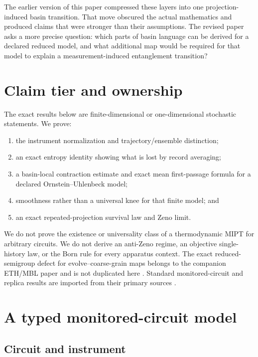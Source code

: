 \documentclass[11pt]{article}
\begin{document}
The earlier version of this paper compressed these layers into one
projection-induced basin transition.  That move obscured the actual
mathematics and produced claims that were stronger than their
assumptions.  The revised paper asks a more precise question: which
parts of basin language can be derived for a declared reduced model, and
what additional map would be required for that model to explain a
measurement-induced entanglement transition?

\section{Claim tier and ownership}

The exact results below are finite-dimensional or one-dimensional
stochastic statements.  We prove:
\begin{enumerate}
\item the instrument normalization and trajectory/ensemble distinction;
\item an exact entropy identity showing what is lost by record
averaging;
\item a basin-local contraction estimate and exact mean first-passage
formula for a declared Ornstein--Uhlenbeck model;
\item smoothness rather than a universal knee for that finite model; and
\item an exact repeated-projection survival law and Zeno limit.
\end{enumerate}

We do not prove the existence or universality class of a thermodynamic
MIPT for arbitrary circuits.  We do not derive an anti-Zeno regime, an
objective single-history law, or the Born rule for every apparatus
context.  The exact reduced-semigroup defect for evolve--coarse-grain
maps belongs to the companion ETH/MBL paper and is not duplicated here
\cite{nero_eth_mbl}.  Standard monitored-circuit and replica results are
imported from their primary sources
\cite{skinner2019,li2018,bao2020,gullans2020}.

\section{A typed monitored-circuit model}

\subsection{Circuit and instrument}
\end{document}
